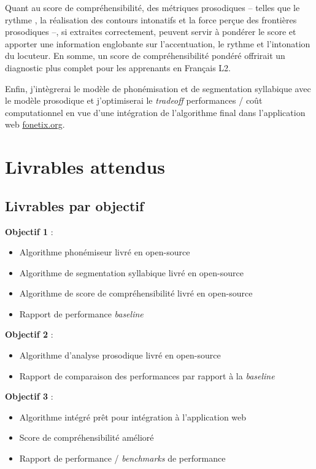 \documentclass[11pt,a4paper]{article}
\begin{document}
Quant au score de compréhensibilité, des métriques prosodiques -- telles que le rythme \cite{astesano2016accentuation}, la réalisation des contours intonatifs \cite{simon2016frontieres} et la force perçue des frontières prosodiques \cite{simon2016frontieres} --, si extraites correctement, peuvent servir à pondérer le score et apporter une information englobante sur l'accentuation, le rythme et l'intonation du locuteur. En somme, un score de compréhensibilité pondéré offrirait un diagnostic plus complet pour les apprenants en Français L2. \newline

Enfin, j'intègrerai le modèle de phonémisation et de segmentation syllabique avec le modèle prosodique et j'optimiserai le \textit{tradeoff} performances / coût computationnel en vue d'une intégration de l'algorithme final dans l'application web \url{fonetix.org}.

\section{Livrables attendus}
\subsection*{Livrables par objectif}
\textbf{Objectif 1} :
\begin{itemize}
    \item Algorithme phonémiseur livré en open-source \cite{lmssc-wav2vec2-base-phonemizer-french_2023}
    \item Algorithme de segmentation syllabique livré en open-source
    \item Algorithme de score de compréhensibilité livré en open-source
    \item Rapport de performance \textit{baseline} \newline
\end{itemize}

\textbf{Objectif 2} :
\begin{itemize}
    \item Algorithme d'analyse prosodique livré en open-source
    \item Rapport de comparaison des performances par rapport à la \textit{baseline} \newline
\end{itemize}

\textbf{Objectif 3} :
\begin{itemize}
    \item Algorithme intégré prêt pour intégration à l'application web
    \item Score de compréhensibilité amélioré
    \item Rapport de performance / \textit{benchmarks} de performance \newline
\end{itemize}
\end{document}
